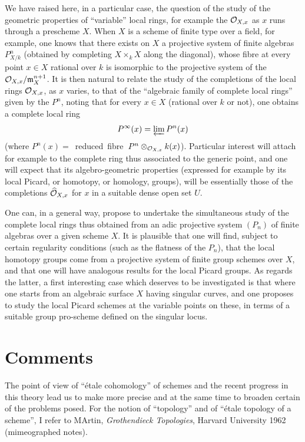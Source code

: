 We have raised here, in a particular case, the question of the study of the geometric properties of ``variable'' local rings, for example the $\mathcal{O}_{X, x}$ as $x$ runs through a prescheme $X$. When $X$ is a scheme of finite type over a field, for example, one knows that there exists on $X$ a projective system of finite algebras $P^n_{X/k}$ (obtained by completing $X\times_k X$ along the diagonal), whose fibre at every point $x\in X$ rational over $k$ is isomorphic to the projective system of the $\mathcal{O}_{X, x}/\mathfrak{m}_X^{n+1}$. It is then natural to relate the study of the completions of the local rings $\mathcal{O}_{X, x}$, as $x$ varies, to that of the ``algebraic family of complete local rings'' given by the $P^n$, noting that for every $x\in X$ (rational over $k$ or not), one obtains a complete local ring
$$
P^{\infty}(x)=\varprojlim P^n(x)
$$
(where $P^n(x)=$~reduced~fibre~$P^n\otimes_{\mathcal{O}_{X, x}}k(x)$). Particular interest will attach for example to the complete ring thus associated to the generic point, and one will expect that its algebro-geometric properties (expressed for example by its local Picard, or homotopy, or homology, groups), will be essentially those of the completions $\widehat{{\mathcal O}}_{X, x}$ for $x$ in a suitable dense open set $U$.

One can, in a general way, propose to undertake the simultaneous study of the complete local rings thus obtained from an adic projective system $(P_n)$ of finite algebras over a given scheme $X$. It is plausible that one will find, subject to certain regularity conditions (such as the flatness of the $P_n$), that the local homotopy groups come from a projective system of finite group schemes over $X$, and that one will have analogous results for the local Picard groups. As regards the latter, a first interesting case which deserves to be investigated is that where one starts from an algebraic surface $X$ having singular curves, and one proposes to study the local Picard schemes at the variable points on these, in terms of a suitable group pro-scheme defined on the singular locus.

\section[Comments]{Comments\protect\sfootnotemark} \label{XIII.6}

The point of view of ``\'etale cohomology'' of schemes and the recent progress in this theory lead us to make more precise and at the same time to broaden certain of the problems posed. For the notion of ``topology'' and of ``\'etale topology of a scheme'', I refer to M\ptbl Artin, \emph{Grothendieck Topologies}, Harvard University 1962 (mimeographed notes).

